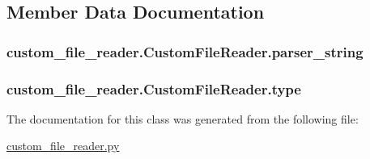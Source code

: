 \subsection{Member Data Documentation}
\hypertarget{classcustom__file__reader_1_1_custom_file_reader_a219137e4cd4de13f1159979b3f8e95ea}{
\subsubsection[{parser\-\_\-string}]{\setlength{\rightskip}{0pt plus 5cm}custom\-\_\-file\-\_\-reader.\-Custom\-File\-Reader.\-parser\-\_\-string}}\label{classcustom__file__reader_1_1_custom_file_reader_a219137e4cd4de13f1159979b3f8e95ea}
\hypertarget{classcustom__file__reader_1_1_custom_file_reader_ab65f0b169e3a73961db6b0501ffb02d0}{
\subsubsection[{type}]{\setlength{\rightskip}{0pt plus 5cm}custom\-\_\-file\-\_\-reader.\-Custom\-File\-Reader.\-type}}\label{classcustom__file__reader_1_1_custom_file_reader_ab65f0b169e3a73961db6b0501ffb02d0}


The documentation for this class was generated from the following file\-:\begin{DoxyCompactItemize}
\item 
\hyperlink{custom__file__reader_8py}{custom\-\_\-file\-\_\-reader.\-py}\end{DoxyCompactItemize}
